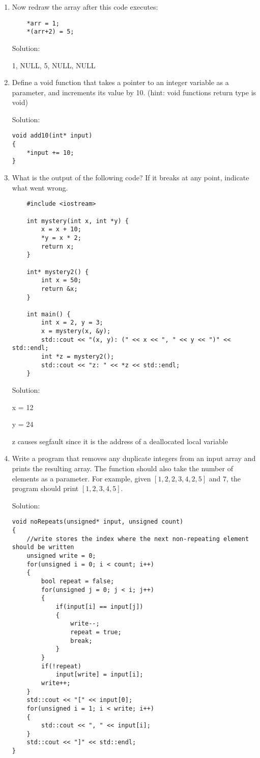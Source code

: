 \documentclass[11pt]{article}
\begin{document}
\begin{enumerate}[leftmargin=*]
NULL, NULL, NULL, NULL, NULL

\item Now redraw the array after this code executes:
\begin{verbatim}
    *arr = 1;
    *(arr+2) = 5;
\end{verbatim}

Solution:

1, NULL, 5, NULL, NULL

\item Define a void function that takes a pointer to an integer variable as a parameter, and increments its value by 10. (hint: void functions return type is void)

Solution:
\begin{verbatim}
void add10(int* input)
{
    *input += 10;
}
\end{verbatim}

\item What is the output of the following code? If it breaks at any point, indicate what went wrong.
\begin{verbatim}
    #include <iostream>

    int mystery(int x, int *y) {
        x = x + 10;
        *y = x * 2;
        return x;
    }

    int* mystery2() {
        int x = 50;
        return &x;
    }

    int main() {
        int x = 2, y = 3;
        x = mystery(x, &y);
        std::cout << "(x, y): (" << x << ", " << y << ")" << std::endl;
        int *z = mystery2();
        std::cout << "z: " << *z << std::endl;
    }
\end{verbatim}

Solution:

x = 12

y = 24

z causes segfault since it is the address of a deallocated local variable

\item Write a program that removes any duplicate integers from an input array and prints the resulting array. The function should also take the number of elements as a parameter. For example, given $[1, 2, 2, 3, 4, 2, 5]$ and $7$, the program should print $[1, 2, 3, 4, 5]$.

Solution:

\begin{verbatim}
void noRepeats(unsigned* input, unsigned count)
{
    //write stores the index where the next non-repeating element should be written
    unsigned write = 0;
    for(unsigned i = 0; i < count; i++)
    {
        bool repeat = false;
        for(unsigned j = 0; j < i; j++)
        {
            if(input[i] == input[j])
            {
                write--;
                repeat = true;
                break;
            }
        }
        if(!repeat)
            input[write] = input[i];
        write++;
    }
    std::cout << "[" << input[0];
    for(unsigned i = 1; i < write; i++)
    {
        std::cout << ", " << input[i];
    }
    std::cout << "]" << std::endl;
}
\end{verbatim}

\end{enumerate}

\label{r:lastpage}
\end{document}
